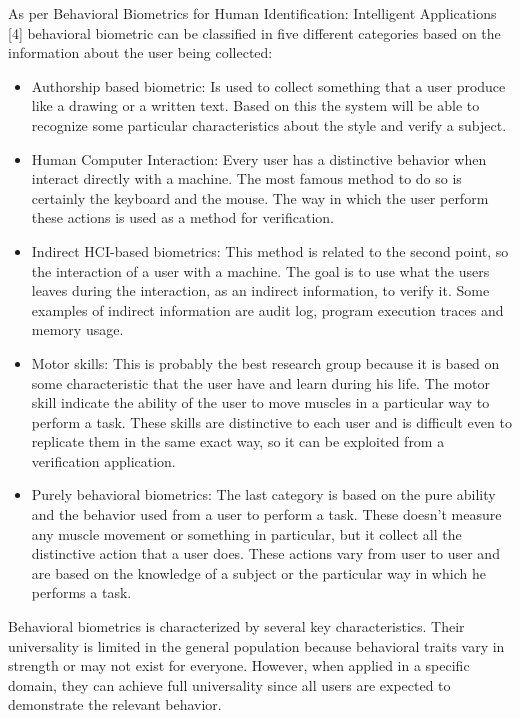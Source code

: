 \documentclass{article}
\begin{document}
As per Behavioral Biometrics for Human Identification: Intelligent Applications [4] behavioral biometric can be classified in five different categories based on the information about the user being collected:
\begin{itemize}
    \item Authorship based biometric: Is used to collect something that a user produce like a drawing or a written text. 
    Based on this the system will be able to recognize some particular characteristics about the style and verify a subject.
    \item Human Computer Interaction: Every user has a distinctive behavior when interact directly with a machine. 
    The most famous method to do so is certainly the keyboard and the mouse. 
    The way in which the user perform these actions is used as a method for verification.
    \item Indirect HCI-based biometrics: This method is related to the second point, so the interaction of a user with a machine.
    The goal is to use what the users leaves during the interaction, as an indirect information, to verify it. 
    Some examples of indirect information are audit log, program execution traces and memory usage.
    \item Motor skills: This is probably the best research group because it is based on some characteristic that the user have and learn during his life.
    The motor skill indicate the ability of the user to move muscles in a particular way to perform a task.
    These skills are distinctive to each user and is difficult even to replicate them in the same exact way, so it can be exploited from a verification application.
    \item Purely behavioral biometrics: The last category is based on the pure ability and the behavior used from a user to perform a task. 
    These doesn't measure any muscle movement or something in particular, but it collect all the distinctive action that a user does.
    These actions vary from user to user and are based on the knowledge of a subject or the particular way in which he performs a task.
\end{itemize}

Behavioral biometrics is characterized by several key characteristics. 
Their universality is limited in the general population because behavioral traits vary in strength or may not exist for everyone. 
However, when applied in a specific domain, they can achieve full universality since all users are expected to demonstrate the relevant behavior.
\end{document}
